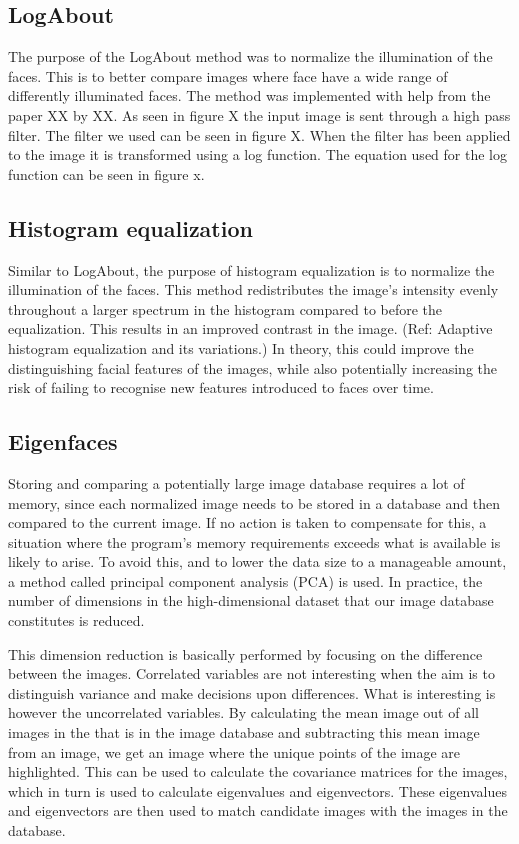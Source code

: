 \subsection{LogAbout}
The purpose of the LogAbout method was to normalize the illumination of the faces. This is to better compare images where face have a wide range of differently illuminated faces. The method was implemented with help from the paper XX by XX. As seen in figure X the input image is sent through a high pass filter. The filter we used can be seen in figure X. When the filter has been applied to the image it is transformed using a log function. The equation used for the log function can be seen in figure x.

\subsection{Histogram equalization}
Similar to LogAbout, the purpose of histogram equalization is to normalize the illumination of the faces. This method redistributes the image’s intensity evenly throughout a larger spectrum in the histogram compared to before the equalization. This results in an improved contrast in the image. (Ref: Adaptive histogram equalization and its variations.) In theory, this could improve the distinguishing facial features of the images, while also potentially increasing the risk of failing to recognise new features introduced to faces over time.

\subsection{Eigenfaces}
Storing and comparing a potentially large image database requires a lot of memory, since each normalized image needs to be stored in a database and then compared to the current image. If no action is taken to compensate for this, a situation where the program’s memory requirements exceeds what is available is likely to arise. To avoid this, and to lower the data size to a manageable amount, a method called principal component analysis (PCA) is used. In practice, the number of dimensions in the high-dimensional dataset that our image database constitutes is reduced.

This dimension reduction is basically performed by focusing on the difference between the images. Correlated variables are not interesting when the aim is to distinguish variance and make decisions upon differences. What is interesting is however the uncorrelated variables. By calculating the mean image out of all images in the that is in the image database and subtracting this mean image from an image, we get an image where the unique points of the image are highlighted. This can be used to calculate the covariance matrices for the images, which in turn is used to calculate eigenvalues and eigenvectors. These eigenvalues and eigenvectors are then used to match candidate images with the images in the database.

